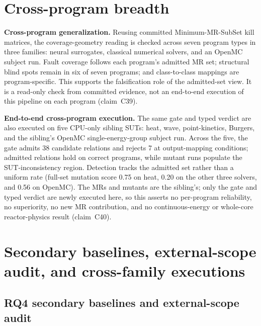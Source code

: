 \documentclass[preprint,12pt]{elsarticle}
\begin{document}
\section{Cross-program breadth}
\label{app:cross-program}

\textbf{Cross-program generalization.} Reusing committed Minimum-MR-SubSet kill matrices, the coverage-geometry reading is checked across seven program types in three families: neural surrogates, classical numerical solvers, and an OpenMC subject run. Fault coverage follows each program's admitted MR set; structural blind spots remain in six of seven programs; and class-to-class mappings are program-specific. This supports the falsification role of the admitted-set view. It is a read-only check from committed evidence, not an end-to-end execution of this pipeline on each program (claim~C39).

\textbf{End-to-end cross-program execution.} The same gate and typed verdict are also executed on five CPU-only sibling SUTs: heat, wave, point-kinetics, Burgers, and the sibling's OpenMC single-energy-group subject run. Across the five, the gate admits 38 candidate relations and rejects 7 at output-mapping conditions; admitted relations hold on correct programs, while mutant runs populate the SUT-inconsistency region. Detection tracks the admitted set rather than a uniform rate (full-set mutation score 0.75 on heat, 0.20 on the other three solvers, and 0.56 on OpenMC). The MRs and mutants are the sibling's; only the gate and typed verdict are newly executed here, so this asserts no per-program reliability, no superiority, no new MR contribution, and no continuous-energy or whole-core reactor-physics result (claim~C40).

\section{Secondary baselines, external-scope audit, and cross-family executions}
\label{app:secondary}

\subsection{RQ4 secondary baselines and external-scope audit}
\label{subsec:llm-mr-baseline}
\end{document}
